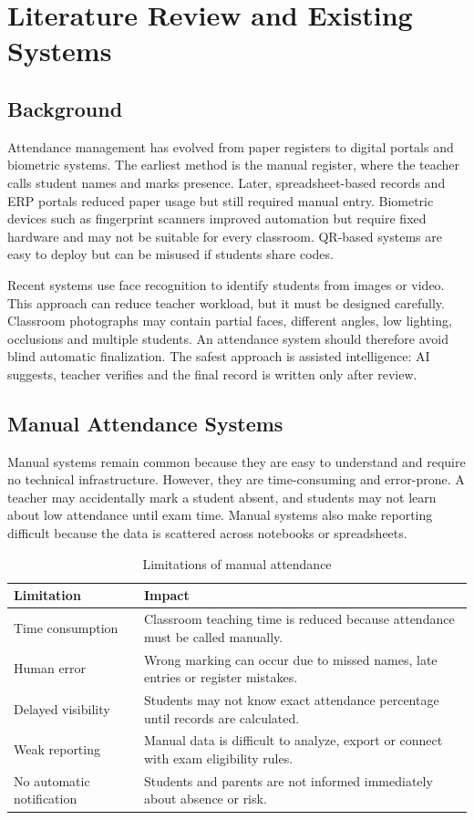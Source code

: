\chapter{Literature Review and Existing Systems}
\label{ch:related}

\section{Background}
Attendance management has evolved from paper registers to digital portals and biometric systems. The earliest method is the manual register, where the teacher calls student names and marks presence. Later, spreadsheet-based records and ERP portals reduced paper usage but still required manual entry. Biometric devices such as fingerprint scanners improved automation but require fixed hardware and may not be suitable for every classroom. QR-based systems are easy to deploy but can be misused if students share codes.

Recent systems use face recognition to identify students from images or video. This approach can reduce teacher workload, but it must be designed carefully. Classroom photographs may contain partial faces, different angles, low lighting, occlusions and multiple students. An attendance system should therefore avoid blind automatic finalization. The safest approach is assisted intelligence: AI suggests, teacher verifies and the final record is written only after review.

\section{Manual Attendance Systems}
Manual systems remain common because they are easy to understand and require no technical infrastructure. However, they are time-consuming and error-prone. A teacher may accidentally mark a student absent, and students may not learn about low attendance until exam time. Manual systems also make reporting difficult because the data is scattered across notebooks or spreadsheets.

\begin{table}[H]
\centering
\caption{Limitations of manual attendance}
\label{tab:manual-limitations}
\begin{tabularx}{\textwidth}{p{4cm}X}
\toprule
\textbf{Limitation} & \textbf{Impact}\\
\midrule
Time consumption & Classroom teaching time is reduced because attendance must be called manually.\\
Human error & Wrong marking can occur due to missed names, late entries or register mistakes.\\
Delayed visibility & Students may not know exact attendance percentage until records are calculated.\\
Weak reporting & Manual data is difficult to analyze, export or connect with exam eligibility rules.\\
No automatic notification & Students and parents are not informed immediately about absence or risk.\\
\bottomrule
\end{tabularx}
\end{table}

